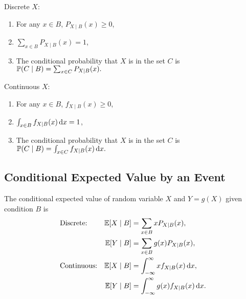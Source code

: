\begin{theorem}
    \begin{multicols}{2}
        Discrete $X$:
        \begin{enumerate}
            \item For any $x \in B$, $P_{X\mid B}(x)\geq 0$,
            \item $\sum_{x\in B}P_{X\mid B}(x)=1$,
            \item The conditional probability that $X$ is in the set $C$ is $\condP{C}{B}=\sum_{x\in C}P_{X\mid B}(x).$
        \end{enumerate}

        \columnbreak

        Continuous $X$:
        \begin{enumerate}
            \item For any $x \in B$, $f_{X\mid B}(x)\geq 0$,
            \item $\int_{x\in B}f_{X\mid B}(x)\mathop{}\!\mathrm{d} x=1$,
            \item The conditional probability that $X$ is in the set $C$ is $\condP{C}{B}=\int_{x\in C}f_{X\mid B}(x)\diff x.$
        \end{enumerate}
    \end{multicols}
\end{theorem}

\subsection{Conditional Expected Value by an Event}
\begin{definition}
    The conditional expected value of random variable $X$ and $Y=g(X)$ given condition $B$ is
    \begin{align*}
        &\text{Discrete:}& \E{X\mid B}&=\sum_{x\in B}xP_{X\mid B}(x), \\
        && \E{Y\mid B}&=\sum_{x\in B}g(x)P_{X\mid B}(x), \\
        &\text{Continuous:}& \E{X\mid B}&=\int_{-\infty}^{\infty}xf_{X\mid B}(x)\diff x, \\
        && \E{Y\mid B}&=\int_{-\infty}^{\infty}g(x)f_{X\mid B}(x)\diff x.
    \end{align*}
\end{definition}


